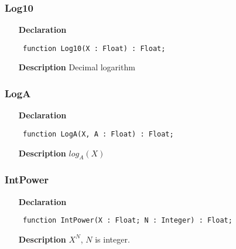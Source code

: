 \documentclass[12pt,a4paper,oneside]{report}
\newcommand{\declarationitem}[1]{\textbf{#1}}
\newcommand{\descriptiontitle}[1]{\textbf{#1}}
\newcommand{\code}[1]{\texttt{#1}}
\begin{document}
\subsubsection{Log10}
\label{umath-Log10}
\begin{itemize}\item[\declarationitem{Declaration}\hfill]
	\begin{flushleft}
		\code{
			function Log10(X : Float) : Float;}
		
	\end{flushleft}
	
	\par
	\item[\descriptiontitle{Description}]
	Decimal logarithm
	
\end{itemize}
\subsubsection{LogA}
\label{umath-LogA}
\begin{itemize}\item[\declarationitem{Declaration}\hfill]
	\begin{flushleft}
		\code{
			function LogA(X, A : Float) : Float;}
		
	\end{flushleft}
	
	\par
	\item[\descriptiontitle{Description}]
	$log_A(X)$
	
\end{itemize}
\subsubsection{IntPower}
\label{umath-IntPower}
\begin{itemize}\item[\declarationitem{Declaration}\hfill]
	\begin{flushleft}
		\code{
			function IntPower(X : Float; N : Integer) : Float;}
		
	\end{flushleft}
	
	\par
	\item[\descriptiontitle{Description}]
	$X^N$, $N$ is integer.
	
\end{itemize}
\end{document}
